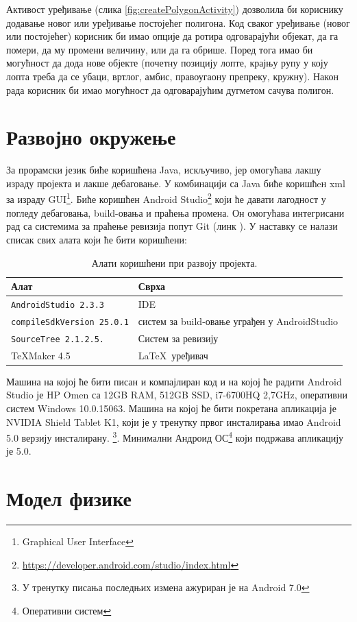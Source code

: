 Активост уређивање (слика \ref{fig:createPolygonActivity}) дозволила би кориснику додавање новог или уређивање постојећег полигона. Код сваког уређивање (новог или постојећег) корисник би имао опције да ротира одговарајући објекат, да га помери, да му промени величину, или да га обрише. Поред тога имао би могућност да дода нове објекте (почетну позицију лопте, крајњу рупу у коју лопта треба да се убаци, вртлог, амбис, правоугаону препреку, кружну). Након рада корисник би имао могућност да одговарајућим дугметом сачува полигон.

\section{Развојно окружење}
За прорамски језик биће коришћена Java, искључиво, јер омогућава лакшу израду пројекта и лакше дебаговање. У комбинацији са Java биће коришћeн xml за израду GUI\footnote{Graphical User Interface}. Биће коришћен  Android Studio\footnote{\url{https://developer.android.com/studio/index.html}} који ће давати лагодност у погледу дебаговања, build-овања и праћења промена. Он омогућава интегрисани рад са системима за праћење ревизија попут Git (линк \cite{BitBucket}). У наставку се налази списак свих алата који ће бити коришћени:
\begin{table}[H]\centering
\begin{tabular}{ l  l } \toprule
{\bf Алат} & {\bf Сврха}\\ \midrule
{\tt AndroidStudio 2.3.3} & IDE\\
{\tt compileSdkVersion 25.0.1} & систем за build-овање уграђен у AndroidStudio\\
{\tt SourceTree 2.1.2.5.} & Систем за ревизију\\
\TeX Maker 4.5 & \LaTeX\ уређивач\\
\bottomrule
\end{tabular}
\caption{Алати коришћени при развоју пројекта.} \label{UsedTools}
\end{table}
Машина на којој ће бити писан и компајлиран код и на којој ће радити Android Studio је HP Omen са 12GB RAM, 512GB SSD, i7-6700HQ 2,7GHz, оперативни систем Windows 10.0.15063. Машина на којој ће бити покретана апликација је NVIDIA Shield Tablet K1, који је у тренутку првог инсталирања имао Android 5.0 верзију инсталирану. \footnote{У тренутку писања последњих измена ажуриран је на Android 7.0}. Минимални Андроид ОС\footnote{Оперативни систем} који подржава апликацију је 5.0.

\section{Модел физике} \label{Collision}

